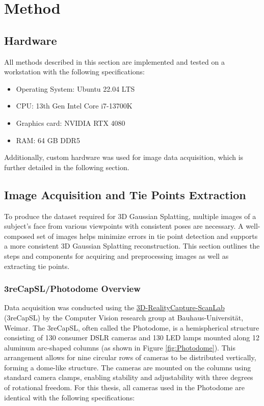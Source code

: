 \chapter{Method}

\label{chap:method}

\section{Hardware}
All methods described in this section are implemented and tested on a workstation with the following specifications:
\begin{itemize}[noitemsep]
	\item Operating System: Ubuntu 22.04 LTS
	\item CPU: 13th Gen Intel Core i7-13700K
	\item Graphics card: NVIDIA RTX 4080
	\item RAM: 64 GB DDR5
\end{itemize}

Additionally, custom hardware was used for image data acquisition, which is further detailed in the following section.


\section{Image Acquisition and Tie Points Extraction}

To produce the dataset required for 3D Gaussian Splatting, multiple images of a subject's face from various viewpoints with consistent poses are necessary. A well-composed set of images helps minimize errors in tie point detection and supports a more consistent 3D Gaussian Splatting reconstruction. This section outlines the steps and components for acquiring and preprocessing images as well as extracting tie points.

\subsection{3reCapSL/Photodome Overview}
Data acquisition was conducted using the \href{https://www.uni-weimar.de/de/medien/professuren/medieninformatik/computer-vision/forschung/3d-realitycapture-scanlab/}{3D-RealityCapture-ScanLab} (3reCapSL) by the Computer Vision research group at Bauhaus-Universität, Weimar. The 3reCapSL, often called the Photodome, is a hemispherical structure consisting of 130 consumer DSLR cameras and 130 LED lamps mounted along 12 aluminum arc-shaped columns (as shown in Figure \ref{fig:Photodome}). This arrangement allows for nine circular rows of cameras to be distributed vertically, forming a dome-like structure. The cameras are mounted on the columns using standard camera clamps, enabling stability and adjustability with three degrees of rotational freedom. For this thesis, all cameras used in the Photodome are identical with the following specifications:

